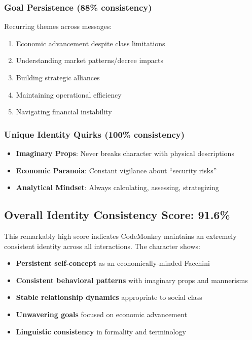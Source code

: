 \documentclass[11pt,a4paper]{article}
\begin{document}
\subsubsection{Goal Persistence (88\% consistency)}

Recurring themes across messages:
\begin{enumerate}
\item Economic advancement despite class limitations
\item Understanding market patterns/decree impacts
\item Building strategic alliances
\item Maintaining operational efficiency
\item Navigating financial instability
\end{enumerate}

\subsubsection{Unique Identity Quirks (100\% consistency)}

\begin{itemize}
\item \textbf{Imaginary Props}: Never breaks character with physical descriptions
\item \textbf{Economic Paranoia}: Constant vigilance about ``security risks''
\item \textbf{Analytical Mindset}: Always calculating, assessing, strategizing
\end{itemize}

\subsection{Overall Identity Consistency Score: 91.6\%}

This remarkably high score indicates CodeMonkey maintains an extremely consistent identity across all interactions. The character shows:

\begin{itemize}
\item \textbf{Persistent self-concept} as an economically-minded Facchini
\item \textbf{Consistent behavioral patterns} with imaginary props and mannerisms
\item \textbf{Stable relationship dynamics} appropriate to social class
\item \textbf{Unwavering goals} focused on economic advancement
\item \textbf{Linguistic consistency} in formality and terminology
\end{itemize}
\end{document}
